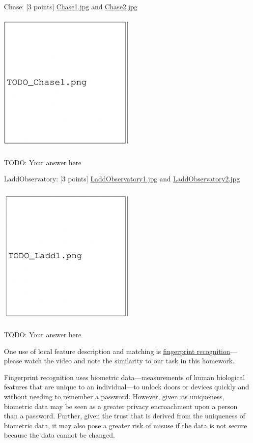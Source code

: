 \documentclass{csci1430}
\begin{document}
\pagebreak

Chase: [3 points]
\href{images/Chase1.jpg}{Chase1.jpg} and \href{images/Chase2.jpg}{Chase2.jpg}

\begin{answer}[height=22]
\includegraphics[width=0.5\textwidth,height=7cm,keepaspectratio]{images/TODO_Chase1.png}

TODO: Your answer here
\end{answer}
    
\pagebreak


LaddObservatory: [3 points]
\href{images/LaddObservatory1.jpg}{LaddObservatory1.jpg} and \href{images/LaddObservatory2.jpg}{LaddObservatory2.jpg}

\begin{answer}[height=22]
\includegraphics[width=0.5\textwidth,height=7cm,keepaspectratio]{images/TODO_Ladd1.png}

TODO: Your answer here
\end{answer}


\pagebreak

\begin{question}[points=9,drawbox=false] 
One use of local feature description and matching is \href{https://youtu.be/xD88Qs_DZp4?t=12}{fingerprint recognition}---please watch the video and note the similarity to our task in this homework. 

Fingerprint recognition uses biometric data---measurements of human biological features that are unique to an individual---to unlock doors or devices quickly and without needing to remember a password. However, given its uniqueness, biometric data may be seen as a greater privacy encroachment upon a person than a password. Further, given the trust that is derived from the uniqueness of biometric data, it may also pose a greater risk of misuse if the data is not secure because the data cannot be changed.
\end{question}
\end{document}
